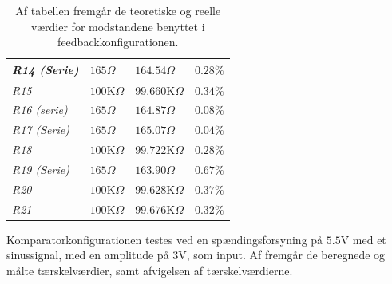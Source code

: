 \begin{table}[H]
\begin{tabular}{|l|l|l|l|}
\textit{R14 (Serie)}    & $165\Omega$              & $164.54\Omega$      & $0.28\%$           \\ \hline
\textit{R15}            & $100$K$\Omega$           & $99.660$K$\Omega$   & $0.34\%$           \\ \hline
\textit{R16 (serie)}    & $165\Omega$              & $164.87\Omega$      & $0.08\%$           \\ \hline
\textit{R17 (Serie)}    & $165\Omega$              & $165.07\Omega$      & $0.04\%$           \\ \hline
\textit{R18}            & $100$K$\Omega$           & $99.722$K$\Omega$   & $0.28\%$           \\ \hline
\textit{R19 (Serie)}    & $165\Omega$              & $163.90\Omega$      & $0.67\%$           \\ \hline
\textit{R20}            & $100$K$\Omega$           & $99.628$K$\Omega$   & $0.37\%$           \\ \hline
\textit{R21}            & $100$K$\Omega$           & $99.676$K$\Omega$   & $0.32\%$           \\ \hline
\end{tabular}
\caption{Af tabellen fremgår de teoretiske og reelle værdier for modstandene benyttet i feedbackkonfigurationen.}
\label{Tab:komparator_modstande}
\end{table}
\noindent Komparatorkonfigurationen testes ved en spændingsforsyning på $5.5$V med et sinussignal, med en amplitude på $3$V, som input. Af  fremgår de beregnede og målte tærskelværdier, samt afvigelsen af tærskelværdierne. 

